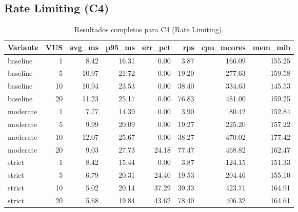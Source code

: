 \subsection{Rate Limiting (C4)}
\begin{table}[htbp]
\centering
\small
\caption{Resultados completos para C4 (Rate Limiting).}
\label{tab:s2-c4}
\begin{tabular}{lrrrrrrr}
\toprule
Variante & VUS & avg\_ms & p95\_ms & err\_pct & rps & cpu\_mcores & mem\_mib \\
\midrule
baseline & 1  & 8.42  & 16.31 & 0.00  & 3.87  & 166.09 & 155.25 \\
baseline & 5  & 10.97 & 21.72 & 0.00  & 19.20 & 277.63 & 159.58 \\
baseline & 10 & 10.94 & 23.53 & 0.00  & 38.40 & 334.63 & 145.53 \\
baseline & 20 & 11.23 & 25.17 & 0.00  & 76.83 & 481.00 & 159.25 \\
moderate & 1  & 7.77  & 14.39 & 0.00  & 3.90  & 80.42  & 152.84 \\
moderate & 5  & 9.99  & 20.09 & 0.00  & 19.27 & 225.20 & 157.22 \\
moderate & 10 & 12.07 & 25.67 & 0.00  & 38.27 & 470.02 & 177.42 \\
moderate & 20 & 9.03  & 27.73 & 24.18 & 77.47 & 468.82 & 162.47 \\
strict   & 1  & 8.42  & 15.44 & 0.00  & 3.87  & 124.15 & 151.33 \\
strict   & 5  & 6.79  & 20.31 & 24.40 & 19.53 & 204.46 & 155.10 \\
strict   & 10 & 5.02  & 20.14 & 37.29 & 39.33 & 423.71 & 164.91 \\
strict   & 20 & 5.68  & 19.84 & 43.62 & 78.40 & 406.32 & 164.61 \\
\bottomrule
\end{tabular}
\end{table}

